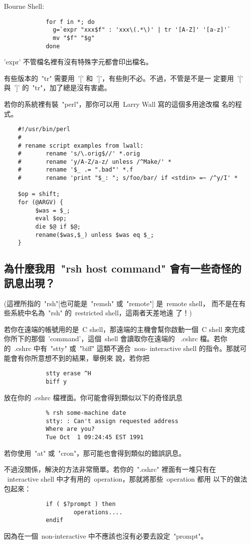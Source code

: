\documentclass{article}
\begin{document}
\begin{CJK*}{Bg5}{ming}
        Bourne Shell:
\begin{verbatim}
            for f in *; do
              g=`expr "xxx$f" : 'xxx\(.*\)' | tr '[A-Z]' '[a-z]'`
              mv "$f" "$g"
            done
\end{verbatim}
	'expr' 不管檔名裡有沒有特殊字元都會印出檔名。

	有些版本的~"tr" 需要用~'[' 和~']'，有些則不必。不過，不管是不是一
	定要用~'['  與~']' 的~"tr"，加了總是沒有害處。

	若你的系統裡有裝~"perl"，那你可以用~Larry Wall 寫的這個多用途改檔
	名的程式。 
\begin{verbatim}
	#!/usr/bin/perl
	#
	# rename script examples from lwall:
	#       rename 's/\.orig$//' *.orig
	#       rename 'y/A-Z/a-z/ unless /^Make/' *
	#       rename '$_ .= ".bad"' *.f
	#       rename 'print "$_: "; s/foo/bar/ if <stdin> =~ /^y/I' *

	$op = shift;
	for (@ARGV) {
	     $was = $_;
	     eval $op;
	     die $@ if $@;
	     rename($was,$_) unless $was eq $_;
	}
\end{verbatim}

\subsection{為什麼我用~"rsh host command" 會有一些奇怪的訊息出現？}

	(這裡所指的~"rsh"[也可能是~"remsh" 或~"remote"] 是~remote shell，
	而不是在有些系統中名為~"rsh" 的~restricted shell，這兩者天差地遠
	了！)

	若你在遠端的帳號用的是~C shell，那遠端的主機會幫你啟動一個~C 
	shell 來完成你所下的那個~'command'，這個~shell 會讀取你在遠端的  
	~.cshrc 檔。若你的~.cshrc 中有~"stty" 或~"biff" 這類不適合~non-
	interactive shell 的指令。那就可能會有你所意想不到的結果，舉例來
	說，若你把
\begin{verbatim}
	        stty erase ^H
	        biff y
\end{verbatim}
	放在你的 .cshrc 檔裡面。你可能會得到類似以下的奇怪訊息
\begin{verbatim}
	        % rsh some-machine date
	        stty: : Can't assign requested address
	        Where are you?
	        Tue Oct  1 09:24:45 EST 1991
\end{verbatim}
	若你使用~"at" 或~"cron"，那可能也會得到類似的錯誤訊息。

	不過沒關係，解決的方法非常簡單。若你的~".cshrc" 裡面有一堆只有在 
	~interactive shell 中才有用的~operation，那就將那些~operation 都用
	以下的做法包起來：
\begin{verbatim}
            if ( $?prompt ) then
                    operations....
            endif
\end{verbatim}
	因為在一個~non-interactive 中不應該也沒有必要去設定~"prompt"。


\end{CJK*}
\end{document}
